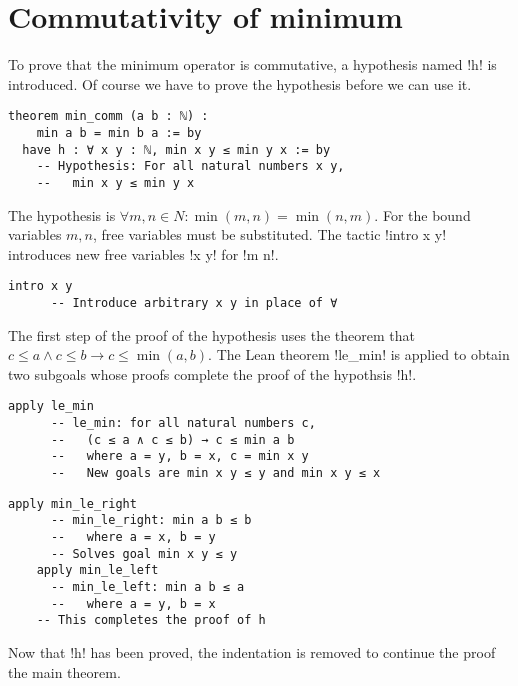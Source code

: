 
\section{Commutativity of minimum}

To prove that the minimum operator is commutative, a hypothesis named !h! is introduced. Of course we have to prove the hypothesis before we can use it.

\begin{Verbatim}
theorem min_comm (a b : ℕ) :
    min a b = min b a := by
  have h : ∀ x y : ℕ, min x y ≤ min y x := by
    -- Hypothesis: For all natural numbers x y,
    --   min x y ≤ min y x
\end{Verbatim}


The hypothesis is $\forall m, n \in N : \min (m,n) = \min (n,m)$. For the bound variables $m, n$, free variables must be substituted. The tactic !intro x y! introduces new free variables !x y! for !m n!.
\begin{Verbatim}[firstnumber=last]
    intro x y
      -- Introduce arbitrary x y in place of ∀
\end{Verbatim}


The first step of the proof of the hypothesis uses the theorem that $c\le a \wedge c \le b \rightarrow c \le \min(a,b)$. The Lean theorem !le_min! is applied to obtain two subgoals whose proofs complete the proof of the hypothsis !h!.

\begin{Verbatim}[firstnumber=last]
    apply le_min
      -- le_min: for all natural numbers c,
      --   (c ≤ a ∧ c ≤ b) → c ≤ min a b
      --   where a = y, b = x, c = min x y
      --   New goals are min x y ≤ y and min x y ≤ x
\end{Verbatim}
\begin{Verbatim}[firstnumber=last]
    apply min_le_right
      -- min_le_right: min a b ≤ b
      --   where a = x, b = y
      -- Solves goal min x y ≤ y
    apply min_le_left
      -- min_le_left: min a b ≤ a
      --   where a = y, b = x
    -- This completes the proof of h
\end{Verbatim}
Now that !h! has been proved, the indentation is removed to continue the proof the main theorem.

